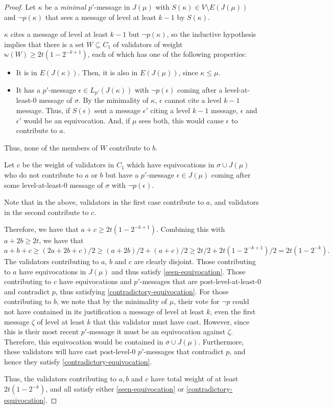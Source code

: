 \documentclass[12pt]{article}
\begin{document}
\begin{proof}
  Let $\kappa$ be a \emph{minimal} $p'$-message in $J(\mu)$ with $S(\kappa) \in V \setminus E(J(\mu))$ and $\neg p(\kappa)$ that sees a message of level at least $k - 1$ by $S(\kappa)$.

  $\kappa$ cites a message of level at least $k-1$ but $\neg p(\kappa)$, so the inductive hypothesis implies that there is a set $W \subseteq C_1$ of validators of weight $\mathbb{w}(W) \geq 2t(1-2^{-k+1})$, each of which has one of the following properties:
  \begin{itemize}
    \item It is in $E(J(\kappa))$. Then, it is also in $E(J(\mu))$, since $\kappa \leq \mu$.
    \item It has a $p'$-message $\epsilon \in L_{p'}(J(\kappa))$ with $\neg p(\epsilon)$ coming after a level-at-least-0 message of $\sigma$. By the minimality of $\kappa$, $\epsilon$ cannot cite a level $k-1$ message. Thus, if $S(\epsilon)$ sent a message $\epsilon'$ citing a level $k-1$ message, $\epsilon$ and $\epsilon'$ would be an equivocation. And, if $\mu$ sees both, this would cause $\epsilon$ to contribute to $a$.
  \end{itemize}
Thus, none of the members of $W$ contribute to $b$.

Let $c$ be the weight of validators in $C_1$ which have equivocations in $\sigma \cup J(\mu)$ who do not contribute to $a$ or $b$ but have a $p'$-message $\epsilon\in J(\mu)$ coming after some level-at-least-0 message of $\sigma$ with $\neg p(\epsilon)$. 

Note that in the above, validators in the first case contribute to $a$, and validators in the second contribute to $c$. 

Therefore, we have that $a+c\geq 2t(1-2^{-k+1}).$ Combining this with $a+2b\geq 2t$, we have that
$$
a+b+c \geq (2a+2b+c)/2 \geq (a+2b)/2+(a+c)/2 \geq 2t/2 + 2t(1-2^{-k+1})/2 = 2t(1-2^{-k})\text{.}
$$
The validators contributing to $a$, $b$ and $c$ are clearly disjoint. Those contributing to $a$ have equivocations in $J(\mu)$ and thus satisfy \ref{seen-equivocation}. Those contributing to $c$ have equivocations and $p'$-messages that are post-level-at-least-0 and contradict $p$, thus satisfying \ref{contradictory-equivocation}. For those contributing to $b$, we note that by the minimality of $\mu$, their vote for $\neg p$ could not have contained in its justification a message of level at least $k$, even the first message $\zeta$ of level at least $k$ that this validator must have cast. However, since this is their most recent $p'$-message it must be an equivocation against $\zeta$. Therefore, this equivocation would be contained in $\sigma \cup J(\mu)$. Furthermore, these validators will have cast post-level-0 $p'$-messages that contradict $p$, and hence they satisfy \ref{contradictory-equivocation}.

Thus, the validators contributing to $a,b$ and $c$ have total weight of at least $2t(1-2^{-k})$, and all satisfy either \ref{seen-equivocation} or \ref{contradictory-equivocation}.
\end{proof}
\end{document}
